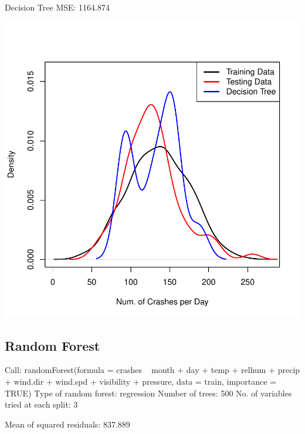 \documentclass[11pt, a4paper]{article}
\begin{document}
\begin{Schunk}
\begin{Soutput}
Decision Tree MSE: 1164.874
\end{Soutput}
\end{Schunk}
\includegraphics{regression-023}





\pagebreak
\subsection{Random Forest}

\begin{Schunk}
\begin{Soutput}
Call:
 randomForest(formula = crashes ~ month + day + temp + relhum +      precip + wind.dir + wind.spd + visibility + pressure, data = train,      importance = TRUE) 
               Type of random forest: regression
                     Number of trees: 500
No. of variables tried at each split: 3

          Mean of squared residuals: 837.889
\end{Soutput}
\end{Schunk}
\end{document}
